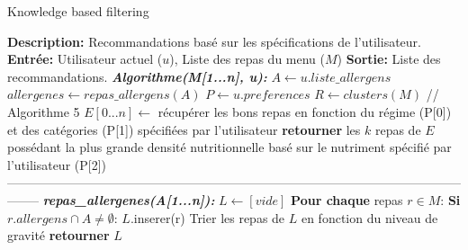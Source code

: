 \documentclass[11pt]{article}
\begin{document}
\begin{algorithm}
    \caption{Knowledge based filtering}
    \begin{algorithmic}[1]
        \Statex \textbf{Description:} Recommandations basé sur les spécifications de l'utilisateur.
        \Statex \textbf{Entrée:} Utilisateur actuel ($u$), Liste des repas du menu ($M$)
        \Statex \textbf{Sortie:} Liste des recommandations.
        \State \textbf{\textit{Algorithme(M[1...n], u):}}
        \State \hspace{0.5cm} $A \leftarrow u.liste\_allergens$
        \State \hspace{0.5cm} $allergenes \leftarrow repas\_allergens(A)$
        \State \hspace{0.5cm} $P \leftarrow u.preferences$
        \State \hspace{0.5cm} $R \leftarrow clusters(M)$ // Algorithme 5
        \State \hspace{0.5cm} $E[0...n] \leftarrow$ récupérer les bons repas en fonction du régime (P[0]) et des
        \State \hspace{0.5cm} catégories (P[1]) spécifiées par l'utilisateur
        \State \hspace{0.5cm} \textbf{retourner} les $k$ repas de $E$ possédant la plus grande densité nutritionnelle basé sur
        \State \hspace{0.5cm} le nutriment spécifié par l'utilisateur (P[2])\\
--------------------------------------------------------------------------------------------------------------------
        \State \textbf{\textit{repas\_allergenes(A[1...n]):}}
        \State \hspace{0.5cm} $L \leftarrow [vide]$
        \State \hspace{0.5cm} \textbf{Pour chaque} repas $r\in M$:
        \State \hspace{1cm} \textbf{Si} $r.allergens \cap A \neq \emptyset$:
        \State \hspace{1.5cm} $L$.inserer(r)
        \State \hspace{0.5cm} Trier les repas de $L$ en fonction du niveau de gravité
        \State \hspace{0.5cm} \textbf{retourner} $L$
    \end{algorithmic}
\end{algorithm}
\end{document}
